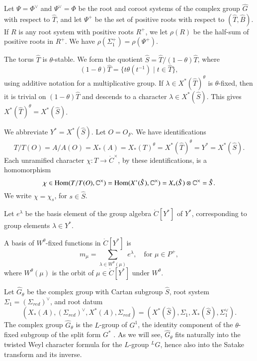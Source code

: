 Let $\Psi=\Phi^\vee$ and $\Psi^\vee=\Phi$ be the root and coroot systems
 of the complex group $\hat G$ with respect to $\hat T$, and let
$\Psi^+$ be the set of positive roots with respect to $(\hat T,\hat B)$.
If $R$ is any root system with positive roots $R^+$, we let $\rho(R)$ be the half-sum
of positive roots in $R^+$.  We have $\rho(\Sigma^+_1) = \rho(\Psi^+)$.


The torus $\hat T$ is $\theta$-stable.  We form the quotient 
$\hat S = \hat T/(1-\theta) \hat T$, where
\[
(1-\theta)\hat T = \{ t\theta(t^{-1}) \mid t\in \hat T\},
\]
using additive notation for a multiplicative group.
If $\lambda\in X^*(\hat T)^\theta$ is $\theta$-fixed, then
it is trivial on $(1-\theta)\hat T$ and descends to a character $\lambda\in X^*(\hat S)$.
This gives $X^*(\hat T)^\theta = X^*(\hat S)$.

We abbreviate $Y^* = X^*(\hat S)$. Let $O=O_F$.
We have identifications
\begin{equation}\label{eqn:identify}
T/T(O)=A/A(O)=X_*(A)=X_*(T)^\theta  =X^*(\hat T)^\theta = Y^* = X^*(\hat S).
\end{equation}
Each unramified character $\chi:T\to \ring{C}^\times$, by these identifications, is a homomorphism
\begin{equation}
\chi\in{\operatorname{Hom}}(T/T(O),\mathbb{C}^\times) = {\operatorname{Hom}}(X^*(\hat S),\mathbb{C}^\times) = X_*(\hat S)\otimes \mathbb{C}^\times = \hat S.
\end{equation}
We write $\chi = \chi_s$, for $s\in\hat S$.

Let $e^\lambda$ be the basis element of  the group algebra $\ring{C}[Y^*]$ of $Y^*$, 
 corresponding to group elements $\lambda\in Y^*$.

A basis of $W^\theta$-fixed functions in $\ring{C}[Y^*]$ is 
\[
m_\mu = \sum_{\lambda\in W^\theta(\mu)} e^\lambda, \quad \text{for }\mu\in P^+,
\]
where $W^\theta(\mu)$ is the orbit of $\mu\in\ring{C}[Y^*]$ under $W^\theta$.




Let $\hat G_\theta$ be the complex group with
 Cartan subgroup $\hat S$, root system 
$\Sigma_1=(\Sigma_{red})^\vee$, and root datum
\[
(X_*(A),(\Sigma_{red})^\vee,X^*(A),\Sigma_{red}) = (X^*(\hat S),\Sigma_1,X_*(\hat S),\Sigma_1^\vee).
\]
The complex group $\hat G_\theta$ is the $L$-group of $G^1$, the identity component of the
$\theta$-fixed subgroup of the split form $G^*$ \cite[\S1.3]{kottwitz1999foundations}.
As we will see, $\hat G_\theta$ fits naturally
into the twisted Weyl character formula for the $L$-group ${}^LG$, hence also into the Satake transform
and its inverse.  

